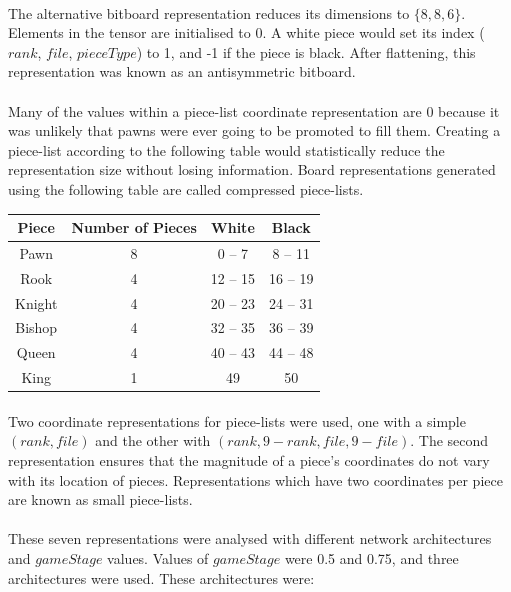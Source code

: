 \documentclass[12pt,a4paper]{book}
\begin{document}
\paragraph{} The alternative bitboard representation reduces its dimensions to $\{8, 8, 6\}$. Elements in the tensor are initialised to 0. A white piece would set its index ($rank$, $file$, $pieceType$) to 1, and -1 if the piece is black. After flattening, this representation was known as an antisymmetric bitboard.

\paragraph{} Many of the values within a piece-list coordinate representation are 0 because it was unlikely that pawns were ever going to be promoted to fill them. Creating a piece-list according to the following table would statistically reduce the representation size without losing information. Board representations generated using the following table are called compressed piece-lists.

\begin{center}
  \begin{tabular}{c | c c c}
    \hline
    \textbf{Piece} & \textbf{Number of Pieces} & \textbf{White} & \textbf{Black} \\ \hline
    Pawn & 8 & 0 -- 7 & 8 -- 11 \\
    Rook & 4 & 12 -- 15 & 16 -- 19 \\
    Knight & 4 & 20 -- 23 & 24 -- 31 \\
    Bishop & 4 & 32 -- 35 & 36 -- 39 \\
    Queen & 4 & 40 -- 43 & 44 -- 48 \\
    King & 1 & 49 & 50 \\
    \hline
  \end{tabular}
\end{center}

\paragraph{} Two coordinate representations for piece-lists were used, one with a simple $(rank, file)$ and the other with $(rank, 9-rank, file, 9-file)$. The second representation ensures that the magnitude of a piece's coordinates do not vary with its location of pieces. Representations which have two coordinates per piece are known as small piece-lists.

\paragraph{} These seven representations were analysed with different network architectures and $gameStage$ values. Values of $gameStage$ were 0.5 and 0.75, and three architectures were used. These architectures were:
\end{document}
